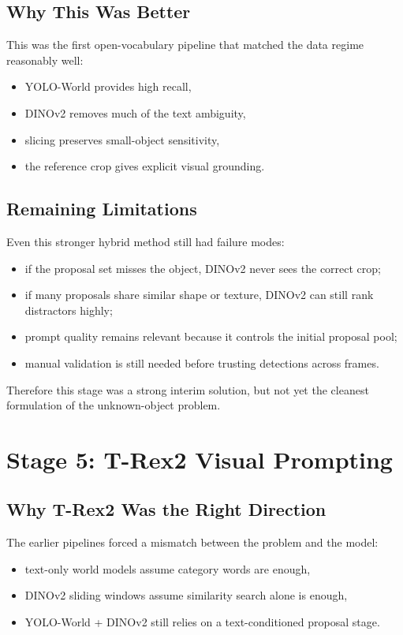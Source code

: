 \documentclass[11pt,a4paper]{article}
\begin{document}
\subsection{Why This Was Better}

This was the first open-vocabulary pipeline that matched the data regime reasonably well:
\begin{itemize}[leftmargin=1.5em]
  \item YOLO-World provides high recall,
  \item DINOv2 removes much of the text ambiguity,
  \item slicing preserves small-object sensitivity,
  \item the reference crop gives explicit visual grounding.
\end{itemize}

\subsection{Remaining Limitations}

Even this stronger hybrid method still had failure modes:
\begin{itemize}[leftmargin=1.5em]
  \item if the proposal set misses the object, DINOv2 never sees the correct crop;
  \item if many proposals share similar shape or texture, DINOv2 can still rank distractors highly;
  \item prompt quality remains relevant because it controls the initial proposal pool;
  \item manual validation is still needed before trusting detections across frames.
\end{itemize}

Therefore this stage was a strong interim solution, but not yet the cleanest formulation of the unknown-object problem.

\section{Stage 5: T-Rex2 Visual Prompting}

\subsection{Why T-Rex2 Was the Right Direction}

The earlier pipelines forced a mismatch between the problem and the model:
\begin{itemize}[leftmargin=1.5em]
  \item text-only world models assume category words are enough,
  \item DINOv2 sliding windows assume similarity search alone is enough,
  \item YOLO-World + DINOv2 still relies on a text-conditioned proposal stage.
\end{itemize}
\end{document}
